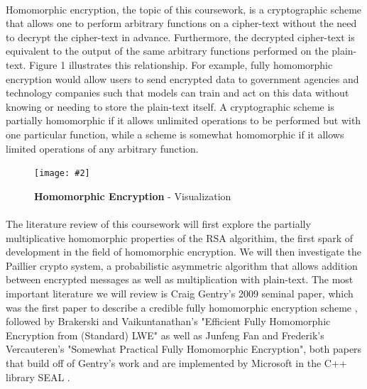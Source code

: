 \documentclass[10pt, a4paper]{article}
\newcommand{\figuremacro}[5]{
    \begin{figure}[#1]
        \centering
        \texttt{[image: \#2]}
        \caption[#3]{\textbf{#3}#4}
        \label{fig:#2}
    \end{figure}
}
\begin{document}
	\paragraph{}
	Homomorphic encryption, the topic of this coursework, is a cryptographic scheme that allows one to perform arbitrary functions on a cipher-text without the need to decrypt the cipher-text in advance. Furthermore, the decrypted cipher-text is equivalent to the output of the same arbitrary functions performed on the plain-text. Figure 1 illustrates this relationship. For example, fully homomorphic encryption would allow users to send encrypted data to government agencies and technology companies such that models can train and act on this data without knowing or needing to store the plain-text itself.  A cryptographic scheme is partially homomorphic if it allows unlimited operations to be performed but with one particular function, while a scheme is somewhat homomorphic if it allows limited operations of any arbitrary function.
	   \figuremacro{h}{homomorphic_encryption}{Homomorphic Encryption}{ - Visualization}{1.0}
	\paragraph{}
	The literature review of this coursework will first explore the partially multiplicative homomorphic properties of the RSA algorithim, the first spark of development in the field of homomorphic encryption. We will then investigate the Paillier crypto system, a probabilistic asymmetric algorithm that allows addition between encrypted messages as well as multiplication with plain-text\cite{paillier1999public}. The most important literature we will review is Craig Gentry's 2009 seminal paper, which was the first paper to describe a credible fully homomorphic encryption scheme \cite{gentry2009fully}, followed by Brakerski and Vaikuntanathan's "Efficient Fully Homomorphic Encryption from (Standard) LWE" as well as Junfeng Fan and Frederik's Vercauteren's "Somewhat Practical Fully Homomorphic Encryption", both papers that build off of Gentry's work and are implemented by Microsoft in the C++ library SEAL \cite{sealcrypto}. 
\end{document}
